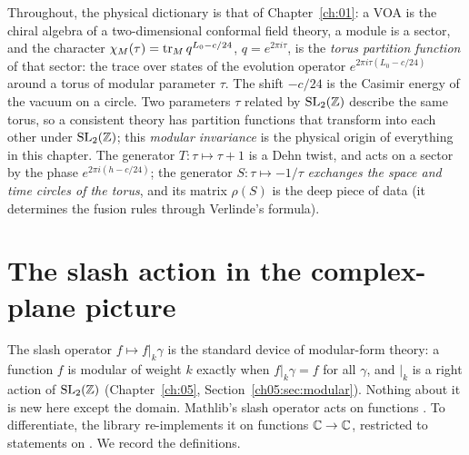 \begin{physics}
Throughout, the physical dictionary is that of Chapter~\ref{ch:01}: a VOA is the chiral algebra of a two-dimensional
conformal field theory, a module is a sector, and the character
$\chi_M(\tau) = \operatorname{tr}_M q^{L_0-c/24}$, $q = e^{2\pi i\tau}$, is the \emph{torus partition function} of that sector: the
trace over states of the evolution operator $e^{2\pi i\tau(L_0-c/24)}$ around a torus of modular parameter $\tau$. The
shift $-c/24$ is the Casimir energy of the vacuum on a circle. Two parameters $\tau$ related by $\mathrm{SL}_2(\mathbb{Z})$ describe the
same torus, so a consistent theory has partition functions that transform into each other under $\mathrm{SL}_2(\mathbb{Z})$; this
\emph{modular invariance} is the physical origin of everything in this chapter. The generator $T:\tau\mapsto\tau+1$ is a
Dehn twist, and acts on a sector by the phase $e^{2\pi i(h-c/24)}$; the generator $S:\tau\mapsto-1/\tau$
\emph{exchanges the space and time circles of the torus}, and its matrix $\rho(S)$ is the deep piece of data (it determines
the fusion rules through Verlinde's formula).
\end{physics}

\section{The slash action in the complex-plane picture}\label{l14:sec:slash}

The slash operator $f\mapsto f|_k\gamma$ is the standard device of modular-form theory: a function $f$ is modular of weight $k$
exactly when $f|_k\gamma = f$ for all $\gamma$, and $|_k$ is a right action of $\mathrm{SL}_2(\mathbb{Z})$ (Chapter~\ref{ch:05},
Section~\ref{ch05:sec:modular}). Nothing about it is new here except the domain.
Mathlib's slash operator  acts on functions . To differentiate, the library re-implements it on
functions ${\mathbb{C}}\to{\mathbb{C}}$, restricted to statements on . We record the definitions.


